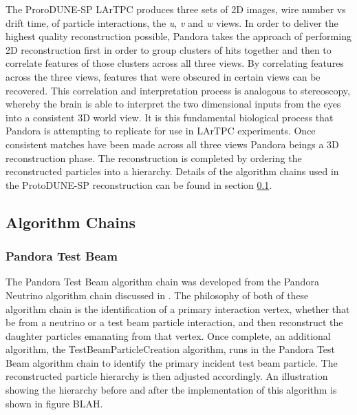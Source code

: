 The ProroDUNE-SP LArTPC produces three sets of 2D images, wire number vs drift time, of particle interactions, the \textit{u}, \textit{v} and \textit{w} views.  In order to deliver the highest quality reconstruction possible, Pandora takes the approach of performing 2D reconstruction first in order to group clusters of hits together and then to correlate features of those clusters across all three views.  By correlating features across the three views, features that were obscured in certain views can be recovered.  This correlation and interpretation process is analogous to stereoscopy, whereby the brain is able to interpret the two dimensional inputs from the eyes into a consistent 3D world view.  It is this fundamental biological process that Pandora is attempting to replicate for use in LArTPC experiments.  Once consistent matches have been made across all three views Pandora beings a 3D reconstruction phase.  The reconstruction is completed by ordering the reconstructed particles into a hierarchy. Details of the algorithm chains used in the ProtoDUNE-SP reconstruction can be found in section \ref{sec:algchains}.

\subsection{Algorithm Chains}
\label{sec:algchains}
\subsubsection{Pandora Test Beam}

The Pandora Test Beam algorithm chain was developed from the Pandora Neutrino algorithm chain discussed in \cite{pandorauboone}.  The philosophy of both of these algorithm chain is the identification of a primary interaction vertex, whether that be from a neutrino or a test beam particle interaction, and then reconstruct the daughter particles emanating from that vertex.  Once complete, an additional algorithm, the TestBeamParticleCreation algorithm, runs in the Pandora Test Beam algorithm chain to identify the primary incident test beam particle.  The reconstructed particle hierarchy is then adjusted accordingly.  An illustration showing the hierarchy before and after the implementation of this algorithm is shown in figure BLAH.


